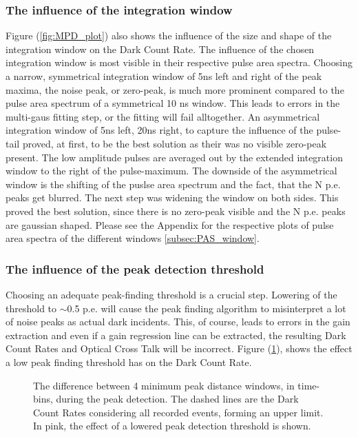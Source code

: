 \documentclass[12pt,article,type=msc,colorback,accentcolor=tud9c]{tudthesis}
\begin{document}
\subsubsection{The influence of the integration window}
Figure (\ref{fig:MPD_plot}) also shows the influence of the size and shape of the integration window on the Dark Count Rate. The influence of the chosen integration window is most visible in their respective pulse area spectra. Choosing a narrow, symmetrical integration window of 5ns left and right of the peak maxima, the noise peak, or zero-peak, is much more prominent compared to the pulse area spectrum of a symmetrical 10 ns window. This leads to errors in the multi-gaus fitting step, or the fitting will fail alltogether. An asymmetrical integration window of 5ns left, 20ns right, to capture the influence of the pulse-tail proved, at first, to be the best solution as their was no visible zero-peak present. The low amplitude pulses are averaged out by the extended integration window to the right of the pulse-maximum. The downside of the asymmetrical window is the shifting of the puslse area spectrum and the fact, that the N p.e. peaks get blurred. The next step was widening the window on both sides. This proved the best solution, since there is no zero-peak visible and the N p.e. peaks are gaussian shaped. Please see the Appendix for the respective plots of pulse area spectra of the different windows \ref{subsec:PAS_window}.

\subsubsection{The influence of the peak detection threshold}

Choosing an adequate peak-finding threshold is a crucial step. Lowering of the threshold to $\sim$0.5 p.e. will cause the peak finding algorithm to misinterpret a lot of noise peaks as actual dark incidents. This, of course, leads to errors in the gain extraction and even if a gain regression line can be extracted, the resulting Dark Count Rates and Optical Cross Talk will be incorrect. Figure (\ref{fig:PF_Thresh_plot}), shows the effect a low peak finding threshold has on the Dark Count Rate.

\begin{figure}[h]
\begin{centering}
\caption{The difference between 4 minimum peak distance windows, in time-bins, during the peak detection. The dashed lines are the Dark Count Rates considering all recorded events, forming an upper limit. In pink, the effect of a lowered peak detection threshold is shown.}
\label{fig:PF_Thresh_plot}
\end{centering}
\end{figure}
\end{document}
